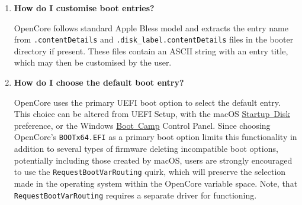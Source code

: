 \documentclass[]{article}
\providecommand{\tightlist}{%
  \setlength{\itemsep}{0pt}\setlength{\parskip}{0pt}}
\begin{document}
\begin{enumerate}
  \begin{itemize}
  \tightlist
  \item Refer to \texttt{boot-args} values such as \texttt{debug=0x100}, \texttt{keepsyms=1},
    \texttt{-v}, and similar.
  \item Do not forget about \texttt{AppleDebug} and \texttt{ApplePanic} properties.
  \item For macOS to correctly recognise and set up serial ports, the \texttt{CustomPciSerialDevice} quirk
    may be enabled when a PCI serial port card is installed.
  \item Take care of \texttt{Booter}, \texttt{Kernel}, and \texttt{UEFI} quirks.
  \item Consider using serial port to inspect early kernel boot failures. For this
    \texttt{debug=0x108}, \texttt{serial=5}, and \texttt{msgbuf=1048576} boot arguments are needed.
    Refer to the patches in Sample.plist when dying before serial init.
  \item Always read the logs carefully.
  \end{itemize}

\item
  \textbf{How do I customise boot entries?}

  OpenCore follows standard Apple Bless model and extracts the entry name
  from \texttt{.contentDetails} and \texttt{.disk\_label.contentDetails} files in the
  booter directory if present. These files contain an ASCII string with an entry title,
  which may then be customised by the user.

\item
  \textbf{How do I choose the default boot entry?}

  OpenCore uses the primary UEFI boot option to select the default entry. This choice
  can be altered from UEFI Setup, with the macOS
  \href{https://support.apple.com/HT202796}{Startup Disk} preference, or the Windows
  \href{https://support.apple.com/guide/bootcamp-control-panel/start-up-your-mac-in-windows-or-macos-bcmp29b8ac66/mac}{Boot Camp} Control Panel.
  Since choosing OpenCore's \texttt{BOOTx64.EFI} as a primary boot option limits this
  functionality in addition to several types of firmware deleting incompatible boot options,
  potentially including those created by macOS, users are strongly encouraged to use the
  \texttt{RequestBootVarRouting} quirk, which will preserve the selection made in
  the operating system within the OpenCore variable space. Note, that \texttt{RequestBootVarRouting}
  requires a separate driver for functioning.


\end{enumerate}
\end{document}
